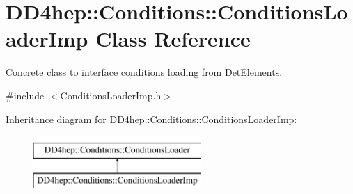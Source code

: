 \hypertarget{class_d_d4hep_1_1_conditions_1_1_conditions_loader_imp}{}\section{D\+D4hep\+:\+:Conditions\+:\+:Conditions\+Loader\+Imp Class Reference}
\label{class_d_d4hep_1_1_conditions_1_1_conditions_loader_imp}


Concrete class to interface conditions loading from Det\+Elements.  




{\ttfamily \#include $<$Conditions\+Loader\+Imp.\+h$>$}

Inheritance diagram for D\+D4hep\+:\+:Conditions\+:\+:Conditions\+Loader\+Imp\+:\begin{figure}[H]
\begin{center}
\leavevmode
\includegraphics[height=2.000000cm]{class_d_d4hep_1_1_conditions_1_1_conditions_loader_imp}
\end{center}
\end{figure}
